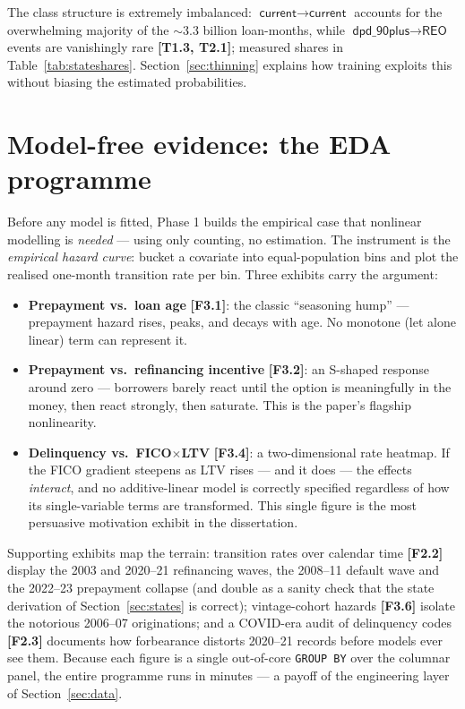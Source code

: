 \documentclass[11pt,a4paper]{article}
\newcommand{\code}[1]{\texttt{#1}}
\newcommand{\state}[1]{\textsf{#1}}
\newcommand{\artifact}[1]{\textbf{[#1]}}
\begin{document}
The class structure is extremely imbalanced: $\state{current}\!\to\!\state{current}$ accounts for the overwhelming majority of the $\sim$3.3 billion loan-months, while $\state{dpd\_90plus}\!\to\!\state{REO}$ events are vanishingly rare \artifact{T1.3, T2.1}; measured shares in Table~\ref{tab:stateshares}. Section~\ref{sec:thinning} explains how training exploits this without biasing the estimated probabilities.

\section{Model-free evidence: the EDA programme}\label{sec:eda}

Before any model is fitted, Phase 1 builds the empirical case that nonlinear modelling is \emph{needed} --- using only counting, no estimation. The instrument is the \emph{empirical hazard curve}: bucket a covariate into equal-population bins and plot the realised one-month transition rate per bin. Three exhibits carry the argument:
\begin{itemize}[itemsep=1pt]
\item \textbf{Prepayment vs.\ loan age} \artifact{F3.1}: the classic ``seasoning hump'' --- prepayment hazard rises, peaks, and decays with age. No monotone (let alone linear) term can represent it.
\item \textbf{Prepayment vs.\ refinancing incentive} \artifact{F3.2}: an S-shaped response around zero --- borrowers barely react until the option is meaningfully in the money, then react strongly, then saturate. This is the paper's flagship nonlinearity.
\item \textbf{Delinquency vs.\ FICO$\times$LTV} \artifact{F3.4}: a two-dimensional rate heatmap. If the FICO gradient steepens as LTV rises --- and it does --- the effects \emph{interact}, and no additive-linear model is correctly specified regardless of how its single-variable terms are transformed. This single figure is the most persuasive motivation exhibit in the dissertation.
\end{itemize}
Supporting exhibits map the terrain: transition rates over calendar time \artifact{F2.2} display the 2003 and 2020--21 refinancing waves, the 2008--11 default wave and the 2022--23 prepayment collapse (and double as a sanity check that the state derivation of Section~\ref{sec:states} is correct); vintage-cohort hazards \artifact{F3.6} isolate the notorious 2006--07 originations; and a COVID-era audit of delinquency codes \artifact{F2.3} documents how forbearance distorts 2020--21 records before models ever see them. Because each figure is a single out-of-core \code{GROUP BY} over the columnar panel, the entire programme runs in minutes --- a payoff of the engineering layer of Section~\ref{sec:data}.
\end{document}
